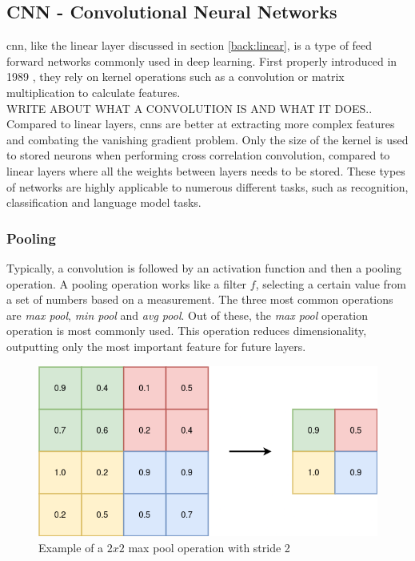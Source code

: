 \subsection{CNN - Convolutional Neural Networks}
\label{back:cnn}

\acrfull{cnn}, like the linear layer discussed in section \ref{back:linear}, is a type of feed forward networks commonly used in deep learning. First properly introduced in 1989 \cite{NIPS1989_53c3bce6}, they rely on kernel operations such as a convolution or matrix multiplication to calculate features.    \\

WRITE ABOUT WHAT A CONVOLUTION IS AND WHAT IT DOES.. \\

Compared to linear layers, \acrshort{cnn}s are better at extracting more complex features and combating the vanishing gradient problem. Only the size of the kernel is used to stored neurons when performing cross correlation convolution, compared to linear layers where all the weights between layers needs to be stored. These types of networks are highly applicable to numerous different tasks, such as recognition, classification and language model tasks. \\

\subsubsection{Pooling}

Typically, a convolution is followed by an activation function and then a pooling operation. A pooling operation works like a filter $f$, selecting a certain value from a set of numbers based on a measurement. The three most common operations are \textit{max pool}, \textit{min pool} and \textit{avg pool}. Out of these, the \textit{max pool} operation operation is most commonly used. This operation reduces dimensionality, outputting only the most important feature for future layers. \\


\begin{figure}[h]
    \centering
    \includegraphics[scale=0.4]{figures/pooling.png}
    \caption{Example of a $2 x 2$ max pool operation with stride 2}
    \label{fig:maxpool}
\end{figure}